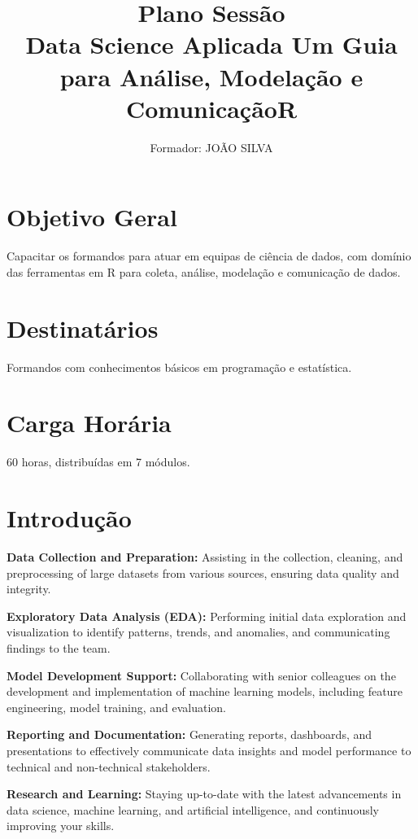 \documentclass[12pt]{article}
\title{Plano Sessão \\ \large Data Science Aplicada  Um Guia para Análise, Modelação e ComunicaçãoR}
\author{Formador: JOÃO SILVA}
\date{}
\begin{document}
\maketitle



\section*{Objetivo Geral}
Capacitar os formandos para atuar em equipas de ciência de dados, com domínio das ferramentas em R para coleta, análise, modelação e comunicação de dados.

\section*{Destinatários}
Formandos com conhecimentos básicos em programação e estatística.

\section*{Carga Horária}
60 horas, distribuídas em 7 módulos.

\section*{Introdução}



\noindent\textbf{Data Collection and Preparation:} Assisting in the collection, cleaning, and preprocessing of large datasets from various sources, ensuring data quality and integrity.

\noindent\textbf{Exploratory Data Analysis (EDA):} Performing initial data exploration and visualization to identify patterns, trends, and anomalies, and communicating findings to the team.

\noindent\textbf{Model Development Support:} Collaborating with senior colleagues on the development and implementation of machine learning models, including feature engineering, model training, and evaluation.

\noindent\textbf{Reporting and Documentation:} Generating reports, dashboards, and presentations to effectively communicate data insights and model performance to technical and non-technical stakeholders.

\noindent\textbf{Research and Learning:} Staying up-to-date with the latest advancements in data science, machine learning, and artificial intelligence, and continuously improving your skills.
\end{document}
